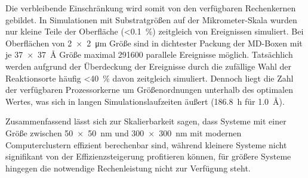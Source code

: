 Die verbleibende Einschränkung wird somit von den verfügbaren Rechenkernen gebildet.
In Simulationen mit Substratgrößen auf der Mikrometer-Skala wurden nur kleine Teile der Oberfläche (\SI{<0.1}{\percent}) zeitgleich von Ereignissen simuliert.
Bei Oberflächen von \SI{2x2}{\micro\meter} Größe sind in dichtester Packung der MD-Boxen mit je \SI{37x37}{\angstrom} Größe maximal \num{291600} parallele Ereignisse möglich.
Tatsächlich werden aufgrund der Überdeckung der Ereignisse durch die zufällige Wahl der Reaktionsorte häufig \SI{<40}{\percent} davon zeitgleich simuliert.
Dennoch liegt die Zahl der verfügbaren Prozessorkerne um Größenordnungen unterhalb des optimalen Wertes, was sich in langen Simulationslaufzeiten äußert (\SI{186.8}{\hour} für \SI{1.0}{\angstrom}).

Zusammenfassend lässt sich zur Skalierbarkeit sagen, dass Systeme mit einer Größe zwischen \SI{50x50}{\nano\meter} und \SI{300x300}{\nano\meter} mit modernen Computerclustern effizient berechenbar sind, während kleinere Systeme nicht signifikant von der Effizienzsteigerung profitieren können, für größere Systeme hingegen die notwendige Rechenleistung nicht zur Verfügung steht.

